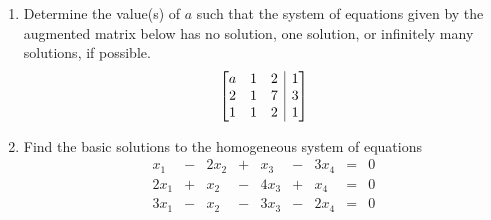 \documentclass[12pt]{article}
\makeatletter
\newenvironment{amatrix}[1]{%
  \left[\begin{array}{@{}*{#1}{c}|c@{}}
}{%
  \end{array}\right]
}
\makeatother
\begin{document}
\begin{enumerate}
\newpage

\item Determine the value(s) of $a$ such that the system of equations given by the augmented matrix below has no solution, one solution, or infinitely many solutions, if possible.
\[
\begin{amatrix}{3}
a & 1 & 2 & 1 \\

2 & 1 & 7 & 3 \\

1 & 1 & 2 & 1 \\
\end{amatrix}
\]

\vspace{3.75in}


\item Find the basic solutions to the homogeneous system of equations
\[
 \begin{array}{ccccccccc}
  x_1&-&2x_2&+&x_3&-&3x_4&=&0\\
 2x_1&+&x_2&-&4x_3&+&x_4&=&0\\
 3x_1&-&x_2&-&3x_3&-&2x_4&=&0
 \end{array}
\]



 \end{enumerate}
\end{document}
